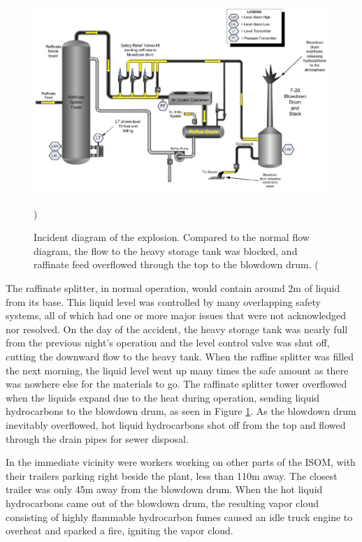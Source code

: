 \documentclass[12pt]{article}
\begin{document}
	\begin{figure}[H]
		
		\includegraphics[width=\textwidth]{BP_Texas_City_incident_diagram.png}
		\caption{Incident diagram of the explosion. Compared to the normal flow diagram, the flow to the heavy storage tank was blocked, and raffinate feed overflowed through the top to the blowdown drum. (\cite{BPreport}})
		\label{fig:ISOMUnit}
	\end{figure}

	The raffinate splitter, in normal operation, would contain around 2m of liquid from its base. This liquid level was controlled by many overlapping safety systems, all of which had one or more major issues that were not acknowledged nor resolved. On the day of the accident, the heavy storage tank was nearly full from the previous night's operation and the level control valve was shut off, cutting the downward flow to the heavy tank. When the raffine splitter was filled the next morning, the liquid level went up many times the safe amount as there was nowhere else for the materials to go. The raffinate splitter tower overflowed when the liquids expand due to the heat during operation, sending liquid hydrocarbons to the blowdown drum, as seen in Figure \ref{fig:ISOMUnit}. As the blowdown drum inevitably overflowed, hot liquid hydrocarbons shot off from the top and flowed through the drain pipes for sewer disposal.

	In the immediate vicinity were workers working on other parts of the ISOM, with their trailers parking right beside the plant, less than 110m away. The closest trailer was only 45m away from the blowdown drum. When the hot liquid hydrocarbons came out of the blowdown drum, the resulting vapor cloud consisting of highly flammable hydrocarbon fumes caused an idle truck engine to overheat and sparked a fire, igniting the vapor cloud. 
	
\end{document}

